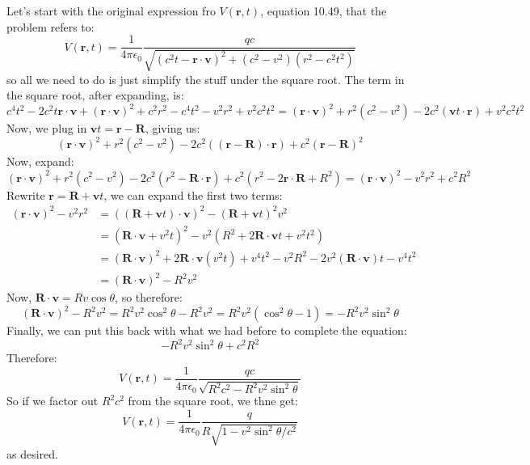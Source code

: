 \documentclass[10pt]{article}
\begin{document}
	\begin{solution}
		Let's start with the original expression fro \( V(\mathbf{r}, t) \), equation 10.49, that the problem
		refers to:
		\[
			V(\mathbf{r}, t) = \frac{1}{4\pi \epsilon_0} \frac{qc}{\sqrt{(c^2 t - \mathbf{r} \cdot
			\mathbf{v})^2 + (c^2 - v^2) (r^2 - c^2 t^2)}}
		\]
		so all we need to do is just simplify the stuff under the square root. The term in the square root,
		after expanding, is:
		\[
			c^{4} t^2 - 2c^2 t \mathbf{r} \cdot \mathbf{v} + (\mathbf{r} \cdot \mathbf{v})^2 + c^2 r^2 -
			c^{4}t^2 - v^2 r^2 + v^2 c^2 t^2 = (\mathbf{r} \cdot \mathbf{v})^2 + r^2(c^2 - v^2) - 2c^2
			(\mathbf{v} t \cdot \mathbf{r}) + v^2c^2 t^2
		\]
		Now, we plug in \( \mathbf{v} t = \mathbf{r} - \mathbf{R} \), giving us:
		\[
			(\mathbf{r} \cdot \mathbf{v})^2 + r^2(c^2 - v^2) - 2c^2((\mathbf{r} - \mathbf{R}) \cdot
			\mathbf{r}) + c^2 (\mathbf{r} - \mathbf{R})^2
		\]
		Now, expand:
		\[
			(\mathbf{r} \cdot \mathbf{v})^2 + r^2(c^2 - v^2) - 2c^2(r^2 - \mathbf{R} \cdot \mathbf{r}) +
			c^2(r^2 - 2 \mathbf{r} \cdot \mathbf{R} + R^2)  = (\mathbf{r} \cdot \mathbf{v})^2 - v^2 r^2 + c^2
			R^2
		\]
		Rewrite \( \mathbf{r} = \mathbf{R} + \mathbf{v} t \), we can expand the first two terms:
		\begin{align*}
			(\mathbf{r} \cdot \mathbf{v})^2 - v^2 r^2 &= ((\mathbf{R} + \mathbf{v} t) \cdot \mathbf{v})^2 -
			(\mathbf{R} + \mathbf{v} t)^2 v^2 \\
			&= (\mathbf{R} \cdot \mathbf{v} + v^2 t)^2 - v^2(R^2 + 2 \mathbf{R} \cdot \mathbf{v} t + v^2 t^2) \\
			&= (\mathbf{R} \cdot \mathbf{v})^2 + 2 \mathbf{R} \cdot \mathbf{v} (v^2 t) +
			v^{4}t^2 - v^2 R^2 - 2v^2 (\mathbf{R} \cdot \mathbf{v}) t - v^{4}t^2 \\
			&=  (\mathbf{R} \cdot \mathbf{v})^2 - R^2 v^2 
		\end{align*}
		Now, \( \mathbf{R} \cdot \mathbf{v} = Rv \cos \theta \), so therefore:
		\[
			(\mathbf{R} \cdot \mathbf{v})^2 - R^2 v^2 = R^2 v^2 \cos^2 \theta - R^2 v^2 = R^2 v^2(\cos^2
			\theta - 1) = - R^2 v^2 \sin^2 \theta
		\]
		Finally, we can put this back with what we had before to complete the equation:
		\[
			-R^2 v^2 \sin^2 \theta + c^2 R^2
		\]
		Therefore:
		\[
			V(\mathbf{r}, t) = \frac{1}{4\pi \epsilon_0} \frac{qc}{\sqrt{R^2 c^2 - R^2 v^2 \sin^2 \theta}}
		\]
		So if we factor out \( R^2c^2 \) from the square root, we thne get:
		\[
			V(\mathbf{r}, t) = \frac{1}{4\pi \epsilon_0} \frac{q}{R\sqrt{1 - v^2 \sin^2 \theta / c^2}}
		\]
		as desired. 
	\end{solution}
\end{document}
